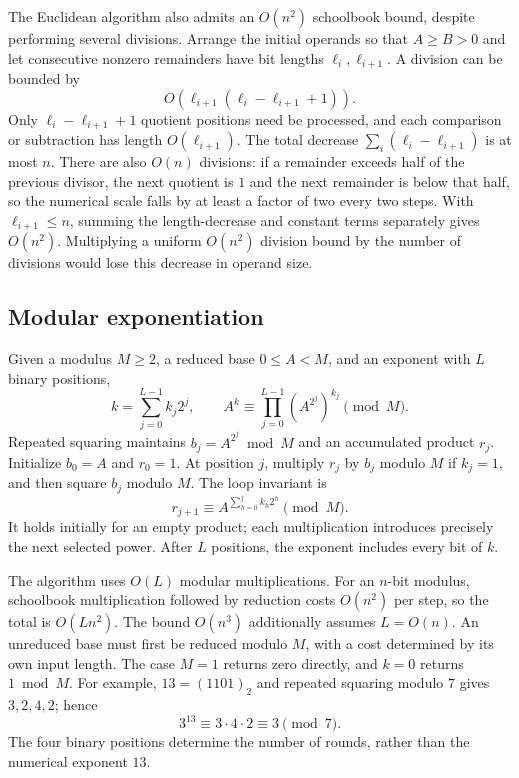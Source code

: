 \documentclass[11pt,oneside,openany]{book}
\theoremstyle{definition}
\begin{document}
The Euclidean algorithm also admits an $O(n^2)$ schoolbook bound, despite performing several divisions. Arrange the initial operands so that $A\ge B>0$ and let consecutive nonzero remainders have bit lengths $\ell_i,\ell_{i+1}$. A division can be bounded by
\begin{equation}
 O\!\left(\ell_{i+1}(\ell_i-\ell_{i+1}+1)\right).
\end{equation}
Only $\ell_i-\ell_{i+1}+1$ quotient positions need be processed, and each comparison or subtraction has length $O(\ell_{i+1})$. The total decrease $\sum_i(\ell_i-\ell_{i+1})$ is at most $n$. There are also $O(n)$ divisions: if a remainder exceeds half of the previous divisor, the next quotient is $1$ and the next remainder is below that half, so the numerical scale falls by at least a factor of two every two steps. With $\ell_{i+1}\le n$, summing the length-decrease and constant terms separately gives $O(n^2)$. Multiplying a uniform $O(n^2)$ division bound by the number of divisions would lose this decrease in operand size.

\subsection{Modular exponentiation}
Given a modulus $M\ge2$, a reduced base $0\le A<M$, and an exponent with $L$ binary positions,
\begin{equation}
 k=\sum_{j=0}^{L-1}k_j2^j,\qquad
 A^k\equiv\prod_{j=0}^{L-1}(A^{2^j})^{k_j}\pmod M.
\end{equation}
Repeated squaring maintains $b_j=A^{2^j}\bmod M$ and an accumulated product $r_j$. Initialize $b_0=A$ and $r_0=1$. At position $j$, multiply $r_j$ by $b_j$ modulo $M$ if $k_j=1$, and then square $b_j$ modulo $M$. The loop invariant is
\begin{equation}
 r_{j+1}\equiv A^{\sum_{h=0}^{j}k_h2^h}\pmod M.
\end{equation}
It holds initially for an empty product; each multiplication introduces precisely the next selected power. After $L$ positions, the exponent includes every bit of $k$.

The algorithm uses $O(L)$ modular multiplications. For an $n$-bit modulus, schoolbook multiplication followed by reduction costs $O(n^2)$ per step, so the total is $O(Ln^2)$. The bound $O(n^3)$ additionally assumes $L=O(n)$. An unreduced base must first be reduced modulo $M$, with a cost determined by its own input length. The case $M=1$ returns zero directly, and $k=0$ returns $1\bmod M$. For example, $13=(1101)_2$ and repeated squaring modulo $7$ gives $3,2,4,2$; hence
\begin{equation}
 3^{13}\equiv3\cdot4\cdot2\equiv3\pmod7.
\end{equation}
The four binary positions determine the number of rounds, rather than the numerical exponent $13$.
\end{document}
